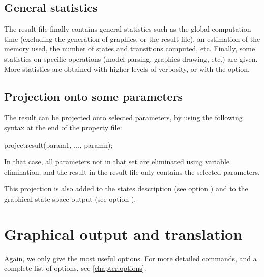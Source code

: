 \section{General statistics}

The result file finally contains general statistics such as the global computation time (excluding the generation of graphics, or the result file), an estimation of the memory used, the number of states and transitions computed, etc.
Finally, some statistics on specific operations (model parsing, graphics drawing, etc.) are given.
More statistics are obtained with higher levels of verbosity, or with the  option.

\section{Projection onto some parameters}\label{section:projection}
The result can be projected onto selected parameters, by using the following syntax at the end of the property file:

\begin{IMITATORmodel}
projectresult(param1, ..., paramn);
\end{IMITATORmodel}


In that case, all parameters not in that set are eliminated using variable elimination, and the result in the result file only contains the selected parameters.

This projection is also added to the states description (see option ) and to the graphical state space output (see option ).






\chapter{Graphical output and translation}


Again, we only give the most useful options.
For more detailed commands, and a complete list of options, see \cref{chapter:options}.

